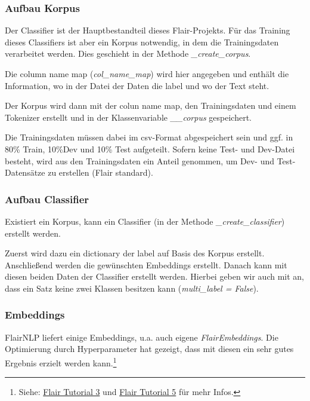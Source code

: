 \documentclass[10pt,a4paper]{article}
\begin{document}
\subsubsection{Aufbau Korpus}
Der Classifier ist der Hauptbestandteil dieses Flair-Projekts. Für das Training dieses Classifiers ist aber ein Korpus notwendig, in dem die Trainingsdaten verarbeitet werden. Dies geschieht in der Methode \textit{\_create\_corpus}.

Die column name map (\textit{col\_name\_map}) wird hier angegeben und enthält die Information, wo in der Datei der Daten die label und wo der Text steht.

Der Korpus wird dann mit der colun name map, den Trainingsdaten und einem Tokenizer erstellt und in der Klassenvariable \textit{\_\_corpus} gespeichert.

Die Trainingsdaten müssen dabei im csv-Format abgespeichert sein und ggf. in 80\% Train, 10\%Dev und 10\% Test aufgeteilt. Sofern keine Test- und Dev-Datei besteht, wird aus den Trainingsdaten ein Anteil genommen, um Dev- und Test-Datensätze zu erstellen (Flair standard).

\subsubsection{Aufbau Classifier}

Existiert ein Korpus, kann ein Classifier (in der Methode \textit{\_create\_classifier}) erstellt werden.

Zuerst wird dazu ein dictionary der label auf Basis des Korpus erstellt. Anschließend werden die gewünschten Embeddings erstellt. Danach kann mit diesen beiden Daten der Classifier erstellt werden. Hierbei geben wir auch mit an, dass ein Satz keine zwei Klassen besitzen kann (\textit{multi\_label = False}).

\subsubsection{Embeddings}
\begin{flushleft}
FlairNLP liefert einige Embeddings, u.a. auch eigene \textit{FlairEmbeddings}. Die Optimierung durch Hyperparameter hat gezeigt, dass mit diesen ein sehr gutes Ergebnis erzielt werden kann.\footnote{Siehe: \href{https://github.com/flairNLP/flair/blob/master/resources/docs/TUTORIAL_3_WORD_EMBEDDING.md}{Flair Tutorial 3} und \href{https://github.com/flairNLP/flair/blob/master/resources/docs/TUTORIAL_5_WORD_EMBEDDING.md}{Flair Tutorial 5} für mehr Infos.}
\end{flushleft}
\end{document}
